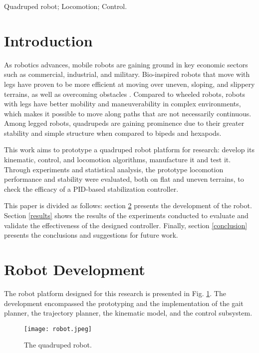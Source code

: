 \documentclass[conference]{IEEEtran}
\begin{document}
\begin{IEEEkeywords}
  Quadruped robot; Locomotion; Control.
\end{IEEEkeywords}

\section{Introduction}

As robotics advances, mobile robots are gaining ground in key economic sectors such as commercial, industrial, and military. Bio-inspired robots that move with legs have proven to be more efficient at moving over uneven, sloping, and slippery terrains, as well as overcoming obstacles \cite{X.134}. Compared to wheeled robots, robots with legs have better mobility and maneuverability in complex environments, which makes it possible to move along paths that are not necessarily continuous. Among legged robots, quadrupeds are gaining prominence due to their greater stability and simple structure when compared to bipeds and hexapods.

This work aims to prototype a quadruped robot platform for research: develop its kinematic, control, and locomotion algorithms, manufacture it and test it. Through experiments and statistical analysis, the prototype locomotion performance and stability were evaluated, both on flat and uneven terrains, to check the efficacy of a PID-based stabilization controller.

This paper is divided as follows: section \ref{development} presents the development of the robot. Section \ref{results} shows the results of the experiments conducted to evaluate and validate the effectiveness of the designed controller. Finally, section \ref{conclusion} presents the conclusions and suggestions for future work.

\section{Robot Development} \label{development}

The robot platform designed for this research is presented in Fig. \ref{fig:robot}. The development encompassed the prototyping and the implementation of the gait planner, the trajectory planner, the kinematic model, and the control subsystem.

\begin{figure}[!tb]
  \centering
  \texttt{[image: robot.jpeg]}
  \vfill
  \caption{The quadruped robot.}
  \label{fig:robot}
  \vspace{-\baselineskip}
\end{figure}
\end{document}
